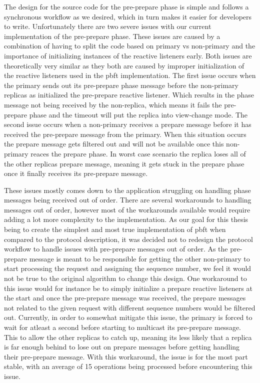 The design for the source code for the pre-prepare phase is simple and follows a synchronous workflow as we desired, which in turn makes it easier for developers to write. Unfortunately there are two severe issues with our current implementation of the pre-prepare phase. These issues are caused by a combination of having to split the code based on primary vs non-primary and the importance of initializing instances of the reactive listeners early. Both issues are theoretically very similar as they both are caused by improper initialization of the reactive listeners used in the \ac{pbft} implementation. The first issue occurs when the primary sends out its pre-prepare phase message before the non-primary replicas as initialized the pre-prepare reactive listener. Which results in the phase message not being received by the non-replica, which means it fails the pre-prepare phase and the timeout will put the replica into view-change mode. The second issue occurs when a non-primary receives a prepare message before it has received the pre-prepare message from the primary. When this situation occurs the prepare message gets filtered out and will not be available once this non-primary reaces the prepare phase. In worst case scenario the replica loses all of the other replicas prepare message, meaning it gets stuck in the prepare phase once it finally receives its pre-prepare message.

These issues mostly comes down to the application struggling on handling phase messages being received out of order. There are several workarounds to handling messages out of order, however most of the workarounds available would require adding a lot more complexity to the implementation. As our goal for this thesis being to create the simplest and most true implementation of \ac{pbft} when compared to the protocol description, it was decided not to redesign the protocol workflow to handle issues with pre-prepare messages out of order. As the pre-prepare message is meant to be responsible for getting the other non-primary to start processing the request and assigning the sequence number, we feel it would not be true to the original algorithm to change this design. One workaround to this issue would for instance be to simply initialize a prepare reactive listeners at the start and once the pre-prepare message was received, the prepare messages not related to the given request with different sequence numbers would be filtered out. Currently, in order to somewhat mitigate this issue, the primary is forced to wait for atleast a second before starting to multicast its pre-prepare message. This to allow the other replicas to catch up, meaning its less likely that a replica is far enough behind to lose out on prepare messages before getting handling their pre-prepare message. With this workaround, the issue is for the most part stable, with an average of 15 operations being processed before encountering this issue.\fi


